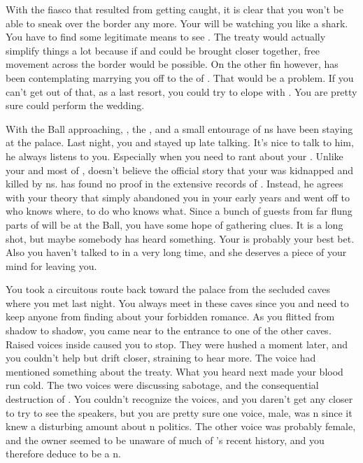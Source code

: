 \documentclass[char]{NeptuneBall}
\begin{document}
With the fiasco that resulted from getting caught, it is clear that you won't be able to sneak over the border any more. Your \cKing{\parent} will be watching you like a shark. You have to find some legitimate means to see \cDiplomat{}. The treaty would actually simplify things a lot because if \pPacifica{} and \pAtlantis{} could be brought closer together, free movement across the border would be possible. On the other fin however, \cKing{\King} \cKing{} has been contemplating marrying you off to the \cPrince{\prince} of \pPacifica{}. That would be a problem.  If you can't get out of that, as a last resort, you could try to elope with \cDiplomat{}. You are pretty sure \cPriest{} could perform the wedding.

With the \cExExKing{} Ball approaching, \cDiplomat{}, the \cPrince{\prince}, and a small entourage of \pPacifica{}ns have been staying at the palace. Last night, you and \cDiplomat{} stayed up late talking. It's nice to talk to him, he always listens to you. Especially when you need to rant about your \cQueen{\parent}. Unlike your \cKing{\parent} and most of \pAtlantis{}, \cDiplomat{} doesn't believe the official story that your \cQueen{\parent} was kidnapped and killed by \pPacifica{}ns. \cDiplomat{\They} has found no proof in the extensive records of \pPacifica{}. Instead, he agrees with your theory that \cQueen{\King} \cQueen{} simply abandoned you in your early years and went off to who knows where, to do who knows what.  Since a bunch of guests from far flung parts of \pAtlantis{} will be at the Ball, you have some hope of gathering clues. It is a long shot, but maybe somebody has heard something. Your \cAriel{\sibling} \cAriel{} is probably your best bet. Also you haven't talked to \cAriel{} in a very long time, and she deserves a piece of your mind for leaving you.

You took a circuitous route back toward the palace from the secluded caves where you met \cDiplomat{} last night. You always meet in these caves since you and \cDiplomat{} need to keep anyone from finding about your forbidden romance. As you flitted from shadow to shadow, you came near to the entrance to one of the other caves. Raised voices inside caused you to stop. They were hushed a moment later, and you couldn't help but drift closer, straining to hear more.  The voice had mentioned something about the treaty. What you heard next made your blood run cold. The two voices were discussing sabotage, and the consequential destruction of \pAtlantis{}. You couldn't recognize the voices, and you daren't get any closer to try to see the speakers, but you are pretty sure one voice, male, was \pAtlantis{}n since it knew a disturbing amount about \pAtlantis{}n politics. The other voice was probably female, and the owner seemed to be unaware of much of \pAtlantis{}'s recent history, and you therefore deduce to be a \pPacifica{}n.
\end{document}
